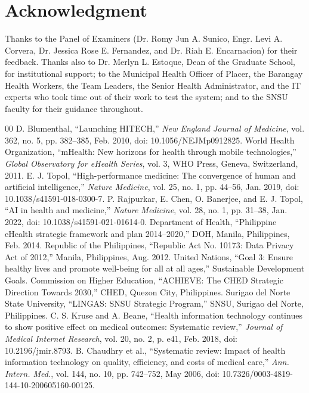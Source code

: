 \documentclass[conference]{IEEEtran}
\begin{document}
\section*{Acknowledgment}
Thanks to the Panel of Examiners (Dr. Romy Jun A. Sunico, Engr. Levi A. Corvera, Dr. Jessica Rose E. Fernandez, and Dr. Riah E. Encarnacion) for their feedback. Thanks also to Dr. Merlyn L. Estoque, Dean of the Graduate School, for institutional support; to the Municipal Health Officer of Placer, the Barangay Health Workers, the Team Leaders, the Senior Health Administrator, and the IT experts who took time out of their work to test the system; and to the SNSU faculty for their guidance throughout.

\begin{thebibliography}{00}
 D. Blumenthal, ``Launching HITECH,'' \textit{New England Journal of Medicine}, vol. 362, no. 5, pp. 382--385, Feb. 2010, doi: 10.1056/NEJMp0912825.
 World Health Organization, ``mHealth: New horizons for health through mobile technologies,'' \textit{Global Observatory for eHealth Series}, vol. 3, WHO Press, Geneva, Switzerland, 2011.
 E. J. Topol, ``High-performance medicine: The convergence of human and artificial intelligence,'' \textit{Nature Medicine}, vol. 25, no. 1, pp. 44--56, Jan. 2019, doi: 10.1038/s41591-018-0300-7.
 P. Rajpurkar, E. Chen, O. Banerjee, and E. J. Topol, ``AI in health and medicine,'' \textit{Nature Medicine}, vol. 28, no. 1, pp. 31--38, Jan. 2022, doi: 10.1038/s41591-021-01614-0.
 Department of Health, ``Philippine eHealth strategic framework and plan 2014--2020,'' DOH, Manila, Philippines, Feb. 2014.
 Republic of the Philippines, ``Republic Act No. 10173: Data Privacy Act of 2012,'' Manila, Philippines, Aug. 2012.
 United Nations, ``Goal 3: Ensure healthy lives and promote well-being for all at all ages,'' Sustainable Development Goals.
 Commission on Higher Education, ``ACHIEVE: The CHED Strategic Direction Towards 2030,'' CHED, Quezon City, Philippines.
 Surigao del Norte State University, ``LINGAS: SNSU Strategic Program,'' SNSU, Surigao del Norte, Philippines.
 C. S. Kruse and A. Beane, ``Health information technology continues to show positive effect on medical outcomes: Systematic review,'' \textit{Journal of Medical Internet Research}, vol. 20, no. 2, p. e41, Feb. 2018, doi: 10.2196/jmir.8793.
 B. Chaudhry et al., ``Systematic review: Impact of health information technology on quality, efficiency, and costs of medical care,'' \textit{Ann. Intern. Med.}, vol. 144, no. 10, pp. 742--752, May 2006, doi: 10.7326/0003-4819-144-10-200605160-00125.

\end{thebibliography}
\end{document}
